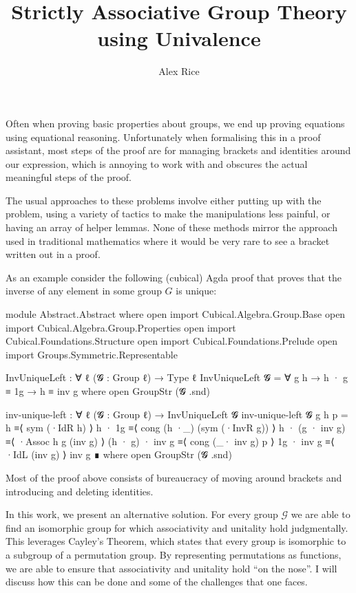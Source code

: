 \documentclass{article}
\title{Strictly Associative Group Theory using Univalence}
\author{Alex Rice}
\begin{document}
\maketitle

Often when proving basic properties about groups, we end up proving equations using equational reasoning. Unfortunately when formalising this in a proof assistant, most steps of the proof are for managing brackets and identities around our expression, which is annoying to work with and obscures the actual meaningful steps of the proof.

The usual approaches to these problems involve either putting up with the problem, using a variety of tactics to make the manipulations less painful, or having an array of helper lemmas. None of these methods mirror the approach used in traditional mathematics where it would be very rare to see a bracket written out in a proof.

As an example consider the following (cubical) Agda proof that proves that the inverse of any element in some group \(G\) is unique:

\begin{code}[hide]
module Abstract.Abstract where
open import Cubical.Algebra.Group.Base
open import Cubical.Algebra.Group.Properties
open import Cubical.Foundations.Structure
open import Cubical.Foundations.Prelude
open import Groups.Symmetric.Representable
\end{code}

\begin{code}
InvUniqueLeft : ∀ {ℓ} (𝓖 : Group ℓ) → Type ℓ
InvUniqueLeft 𝓖 = ∀ g h → h · g ≡ 1g → h ≡ inv g
  where
    open GroupStr (𝓖 .snd)

inv-unique-left : ∀ {ℓ} (𝓖 : Group ℓ) → InvUniqueLeft 𝓖
inv-unique-left 𝓖 g h p =
  h                ≡⟨ sym (·IdR h) ⟩
  h · 1g           ≡⟨ cong (h ·_) (sym (·InvR g)) ⟩
  h · (g · inv g)  ≡⟨ ·Assoc h g (inv g) ⟩
  (h · g) · inv g  ≡⟨ cong (_· inv g) p ⟩
  1g · inv g       ≡⟨ ·IdL (inv g) ⟩
  inv g ∎
  where
    open GroupStr (𝓖 .snd)
\end{code}

Most of the proof above consists of bureaucracy of moving around brackets and introducing and deleting identities.

In this work, we present an alternative solution. For every group \(\mathcal{G}\) we are able to find an isomorphic group for which associativity and unitality hold judgmentally. This leverages Cayley's Theorem, which states that every group is isomorphic to a subgroup of a permutation group. By representing permutations as functions, we are able to ensure that associativity and unitality hold ``on the nose''. I will discuss how this can be done and some of the challenges that one faces.
\end{document}
